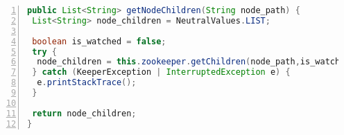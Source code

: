 \documentclass{article}
\begin{document}
\begin{lstlisting}[language=Java, caption={Your text here!}, captionpos=b, basicstyle=\footnotesize, numbers=left, stepnumber=1, backgroundcolor=\color{backcolour}, keywordstyle=\color{blue}]
public List<String> getNodeChildren(String node_path) {
 List<String> node_children = NeutralValues.LIST;
 
 boolean is_watched = false;
 try {
  node_children = this.zookeeper.getChildren(node_path,is_watched);
 } catch (KeeperException | InterruptedException e) {
  e.printStackTrace();
 }

 return node_children;
}
\end{lstlisting}
\end{document}
